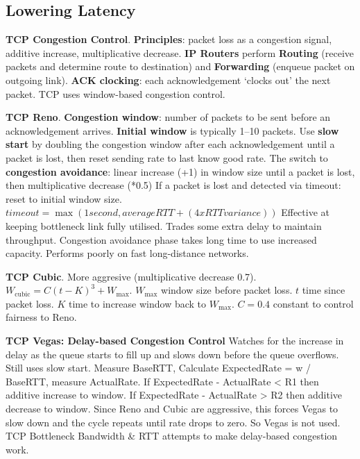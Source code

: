 \documentclass{article}
\begin{document}
\clearpage

\subsection*{Lowering Latency}

\textbf{TCP Congestion Control}.
\textbf{Principles}: packet loss as a congestion signal, additive increase, multiplicative decrease.
\textbf{IP Routers} perform \textbf{Routing} (receive packets and determine route to destination) and
\textbf{Forwarding} (enqueue packet on outgoing link).
\textbf{ACK clocking}: each acknowledgement `clocks out' the next packet.
TCP uses window-based congestion control.

\vspace{\baselineskip}
\textbf{TCP Reno}.
\textbf{Congestion window}: number of packets to be sent before an acknowledgement arrives.
\textbf{Initial window} is typically 1--10 packets.
Use \textbf{slow start} by doubling the congestion window after each acknowledgement until a packet is lost,
then reset sending rate to last know good rate.
The switch to \textbf{congestion avoidance}: linear increase (+1) in window size until a packet is lost, then multiplicative decrease (*0.5)
If a packet is lost and detected via timeout: reset to initial window size.
$timeout = \max(1 second, average RTT + (4 x RTT variance))$
Effective at keeping bottleneck link fully utilised.
Trades some extra delay to maintain throughput.
Congestion avoidance phase takes long time to use increased capacity.
Performs poorly on fast long-distance networks.

\vspace{\baselineskip}
\textbf{TCP Cubic}.
More aggresive (multiplicative decrease 0.7).
$W_{\text{cubic}} = C {(t - K)}^3 + W_{\text{max}}$.
$W_{\text{max}}$ window size before packet loss.
$t$ time since packet loss.
$K$ time to increase window back to $W_{\text{max}}$.
$C = 0.4$ constant to control fairness to Reno.

\vspace{\baselineskip}
\textbf{TCP Vegas: Delay-based Congestion Control}
Watches for the increase in delay as the queue starts to fill up and slows down before the queue overflows.
Still uses slow start.
Measure BaseRTT, Calculate ExpectedRate = w / BaseRTT, measure ActualRate.
If ExpectedRate {-} ActualRate < R1 then additive increase to window.
If ExpectedRate {-} ActualRate > R2 then additive decrease to window.
Since Reno and Cubic are aggressive, this forces Vegas to slow down and the cycle repeats until rate drops to zero.
So Vegas is not used. TCP Bottleneck Bandwidth \& RTT attempts to make delay-based congestion work.
\end{document}
